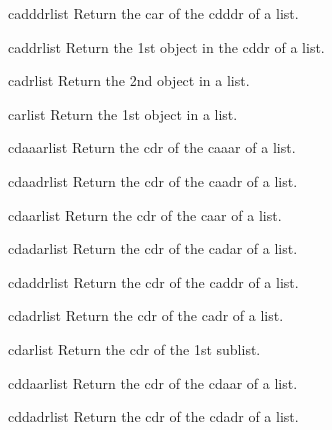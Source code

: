 \begin{accessor}{cadddr}{list}{}{}
  Return the car of the cdddr of a list.
\end{accessor}

\begin{accessor}{caddr}{list}{}{}
  Return the 1st object in the cddr of a list.
\end{accessor}

\begin{accessor}{cadr}{list}{}{}
  Return the 2nd object in a list.
\end{accessor}

\begin{accessor}{car}{list}{}{}
  Return the 1st object in a list.
\end{accessor}

\begin{accessor}{cdaaar}{list}{}{}
  Return the cdr of the caaar of a list.
\end{accessor}

\begin{accessor}{cdaadr}{list}{}{}
  Return the cdr of the caadr of a list.
\end{accessor}

\begin{accessor}{cdaar}{list}{}{}
  Return the cdr of the caar of a list.
\end{accessor}

\begin{accessor}{cdadar}{list}{}{}
  Return the cdr of the cadar of a list.
\end{accessor}

\begin{accessor}{cdaddr}{list}{}{}
  Return the cdr of the caddr of a list.
\end{accessor}

\begin{accessor}{cdadr}{list}{}{}
  Return the cdr of the cadr of a list.
\end{accessor}

\begin{accessor}{cdar}{list}{}{}
  Return the cdr of the 1st sublist.
\end{accessor}

\begin{accessor}{cddaar}{list}{}{}
  Return the cdr of the cdaar of a list.
\end{accessor}

\begin{accessor}{cddadr}{list}{}{}
  Return the cdr of the cdadr of a list.
\end{accessor}

